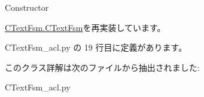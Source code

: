 \begin{DoxyVerb}Constructor
\end{DoxyVerb}
 

\mbox{\hyperlink{classCTextFsm_1_1CTextFsm_ae888a03cec9e1bb808d590dc35a9ec6b}{C\+Text\+Fsm.\+C\+Text\+Fsm}}を再実装しています。



 C\+Text\+Fsm\+\_\+acl.\+py の 19 行目に定義があります。



このクラス詳解は次のファイルから抽出されました\+:\begin{DoxyCompactItemize}
\item 
C\+Text\+Fsm\+\_\+acl.\+py\end{DoxyCompactItemize}
